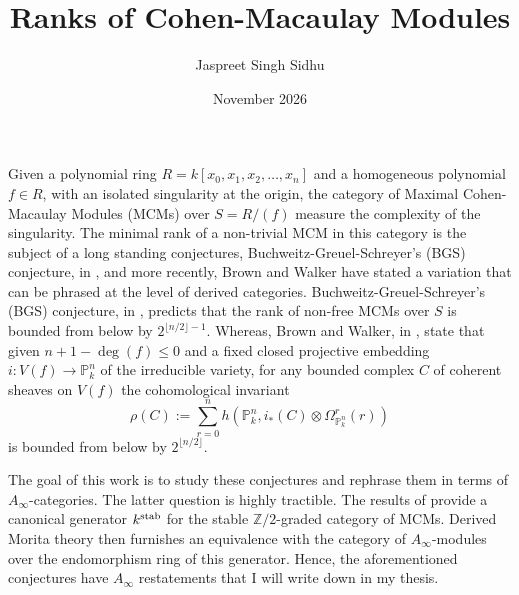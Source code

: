 \documentclass[12pt, a4paper]{article}
\title{Ranks of Cohen-Macaulay Modules}
\author{Jaspreet Singh Sidhu}
\date{November 2026}
\begin{document}
\maketitle
Given a polynomial ring $R=k[x_{0},x_{1},x_{2},\dots,x_{n}]$ and a homogeneous polynomial $f\in R$, with an isolated singularity at the origin, the category of Maximal Cohen-Macaulay Modules (MCMs) over $S=R/(f)$ measure the complexity of the singularity. The minimal rank of a non-trivial MCM in this category is the subject 
of a long standing conjectures, Buchweitz-Greuel-Schreyer's (BGS) conjecture, in \cite{BGS}, and more recently, Brown and Walker have stated a variation that can 
be phrased at the level of derived categories. Buchweitz-Greuel-Schreyer's (BGS) conjecture, in \cite{BGS}, predicts that the rank of non-free MCMs over $S$ is bounded from below by $2^{\lfloor n/2 \rfloor-1}$. Whereas, Brown and Walker, in \cite{BrownWalker}, state that given $n+1-\deg(f)\leq 0$ and a fixed closed projective embedding $i:V(f)\longrightarrow \mathbb{P}_{k}^{n}$ of the irreducible variety, for any bounded complex $C$ of coherent sheaves on $V(f)$ the cohomological invariant
$$\rho(C):=\sum_{r=0}^{n}h(\mathbb{P}_{k}^{n},i_{*}(C)\otimes\Omega^{r}_{\mathbb{P}_{k}^{n}}(r))$$
is bounded from below by $2^{\lfloor n/2\rfloor}$.

The goal of this work is to study these conjectures and rephrase them in terms of $A_\infty$-categories. The latter question is highly tractible. 
The results of \cite{Dyckerhoff} provide a canonical generator $k^{\rm stab}$ for the stable ${\mathbb Z}/2$-graded category of MCMs. Derived Morita theory then furnishes an equivalence 
with the category of $A_\infty$-modules over the endomorphism ring of this generator. Hence, the aforementioned conjectures have $A_\infty$ restatements that I will write down in my 
thesis.
\newpage


\clearpage



\end{document}
